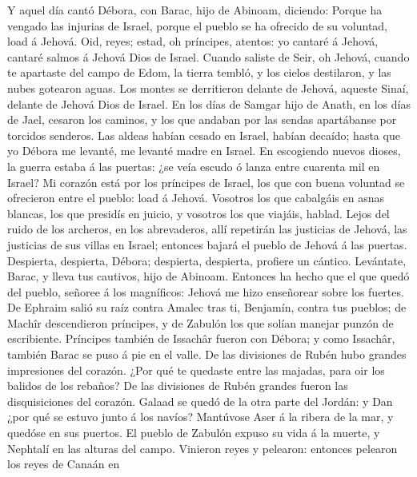  Y aquel día cantó Débora, con Barac, hijo de Abinoam,
diciendo:  Porque ha vengado las injurias de Israel,
porque el pueblo se ha ofrecido de su voluntad, load á Jehová.
 Oid, reyes; estad, oh príncipes, atentos: yo cantaré á
Jehová, cantaré salmos á Jehová Dios de Israel.  Cuando
saliste de Seir, oh Jehová, cuando te apartaste del campo de Edom, la
tierra tembló, y los cielos destilaron, y las nubes gotearon aguas.
 Los montes se derritieron delante de Jehová, aqueste
Sinaí, delante de Jehová Dios de Israel.  En los días de
Samgar hijo de Anath, en los días de Jael, cesaron los caminos, y los
que andaban por las sendas apartábanse por torcidos senderos.
 Las aldeas habían cesado en Israel, habían decaído; hasta
que yo Débora me levanté, me levanté madre en Israel.  En
escogiendo nuevos dioses, la guerra estaba á las puertas: ¿se veía
escudo ó lanza entre cuarenta mil en Israel?  Mi corazón
está por los príncipes de Israel, los que con buena voluntad se
ofrecieron entre el pueblo: load á Jehová.  Vosotros los
que cabalgáis en asnas blancas, los que presidís en juicio, y vosotros
los que viajáis, hablad.  Lejos del ruido de los
archeros, en los abrevaderos, allí repetirán las justicias de Jehová,
las justicias de sus villas en Israel; entonces bajará el pueblo de
Jehová á las puertas.  Despierta, despierta, Débora;
despierta, despierta, profiere un cántico. Levántate, Barac, y lleva tus
cautivos, hijo de Abinoam.  Entonces ha hecho que el que
quedó del pueblo, señoree á los magníficos: Jehová me hizo enseñorear
sobre los fuertes.  De Ephraim salió su raíz contra
Amalec tras ti, Benjamín, contra tus pueblos; de Machîr descendieron
príncipes, y de Zabulón los que solían manejar punzón de escribiente.
 Príncipes también de Issachâr fueron con Débora; y como
Issachâr, también Barac se puso á pie en el valle. De las divisiones de
Rubén hubo grandes impresiones del corazón.  ¿Por qué te
quedaste entre las majadas, para oir los balidos de los rebaños? De las
divisiones de Rubén grandes fueron las disquisiciones del corazón.
 Galaad se quedó de la otra parte del Jordán: y Dan ¿por
qué se estuvo junto á los navíos? Mantúvose Aser á la ribera de la mar,
y quedóse en sus puertos.  El pueblo de Zabulón expuso su
vida á la muerte, y Nephtalí en las alturas del campo. 
Vinieron reyes y pelearon: entonces pelearon los reyes de Canaán en
